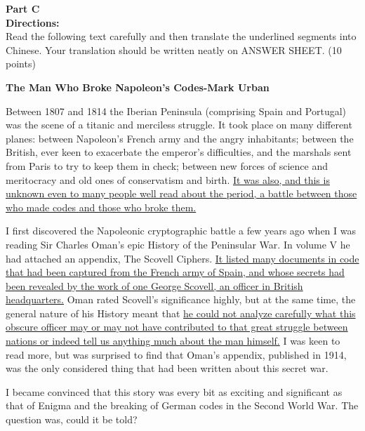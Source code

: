 \phantom{ \linefill \linefill \linefill \linefill \linefill}


\noindent
\textbf{Part C}\\
\textbf{Directions:}\\
Read the following text carefully and then translate the
underlined segments into Chinese. Your
translation should be written neatly on ANSWER SHEET. (10 points)

\TiGanSpace


\begin{center}
	\textbf{ 
	The Man Who Broke Napoleon's Codes-Mark Urban}
\end{center}


Between 1807 and 1814 the Iberian Peninsula (comprising Spain and
Portugal) was the scene of a titanic and
merciless struggle. It took place on many different planes: between
Napoleon's French army and the angry
inhabitants; between the British, ever keen to exacerbate the emperor's
difficulties, and the marshals sent from
Paris to try to keep them in check; between new forces of science and
meritocracy and old ones of conservatism
and birth. \transnum  \uline{It was also, and this is unknown even to many people
well read about the period, a battle between
those who made codes and those who broke them.}





I first discovered the Napoleonic cryptographic battle a few years ago
when I was reading Sir Charles
Oman's epic History of the Peninsular War. In volume V he had attached
an appendix, The Scovell Ciphers. \transnum  \uline{It
listed many documents in code that had been captured from the French
army of Spain, and whose secrets had been
revealed by the work of one George Scovell, an officer in British
headquarters.} Oman rated Scovell's significance
highly, but at the same time, the general nature of his History meant
that \transnum  \uline{he could not analyze carefully what
this obscure officer may or may not have contributed to that great
struggle between nations or indeed tell us
anything much about the man himself.} I was keen to read more, but was
surprised to find that Oman's appendix,
published in 1914, was the only considered thing that had been written
about this secret war.



I became convinced that this story was every bit as exciting and
significant as that of Enigma and the
breaking of German codes in the Second World War. The question was,
could it be told?




